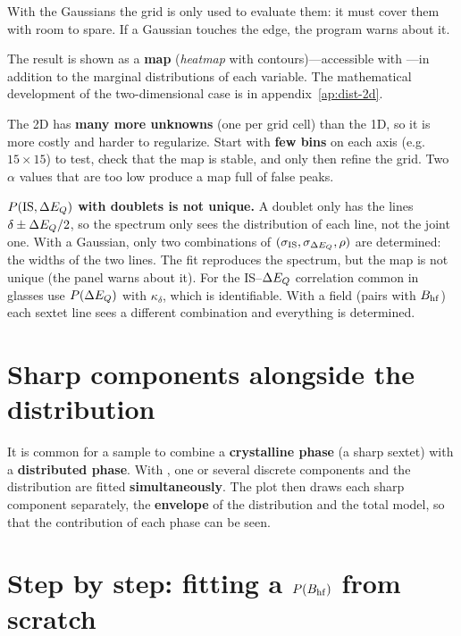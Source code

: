 With the Gaussians the grid is only used to evaluate them: it must cover them with
room to spare. If a Gaussian touches the edge, the program warns about it.

The result is shown as a \textbf{map} (\emph{heatmap} with contours)---accessible
with ---in addition to the marginal distributions of each
variable. The mathematical development of the two-dimensional case is in
appendix~\ref{ap:dist-2d}.

\begin{aviso}
The 2D has \textbf{many more unknowns} (one per grid cell) than the 1D, so it is more
costly and harder to regularize. Start with \textbf{few bins} on each axis (e.g.\
$15\times15$) to test, check that the map is stable, and only then refine the grid.
Two $\alpha$ values that are too low produce a map full of false peaks.
\end{aviso}

\begin{aviso}
\textbf{$P(\text{IS}, \Delta E_{Q})$ with doublets is not unique.} A doublet only has the
lines $\delta \pm \Delta E_{Q}/2$, so the spectrum only sees the distribution of each
line, not the joint one. With a Gaussian, only two combinations of
$(\sigma_{\text{IS}}, \sigma_{\Delta E_{Q}}, \rho)$ are determined: the widths of the two
lines. The fit reproduces the spectrum, but the map is not unique (the panel warns
about it). For the IS--$\Delta E_{Q}$ correlation common in glasses use $P(\Delta E_{Q})$ with
$\kappa_\delta$, which is identifiable. With a field (pairs with $B_{\mathrm{hf}}$) each sextet
line sees a different combination and everything is determined.
\end{aviso}

\section{Sharp components alongside the distribution}
\label{sec:nitidos}

It is common for a sample to combine a \textbf{crystalline phase} (a sharp sextet)
with a \textbf{distributed phase}. With \menu{P(BHF): add active sharp components},
one or several discrete components and the distribution are fitted
\textbf{simultaneously}. The plot then draws each sharp component separately, the
\textbf{envelope} of the distribution and the total model, so that the contribution
of each phase can be seen.

\section{Step by step: fitting a \texorpdfstring{$P(B_{\mathrm{hf}})$}{P(BHF)} from scratch}
\label{sec:paso-a-paso}


